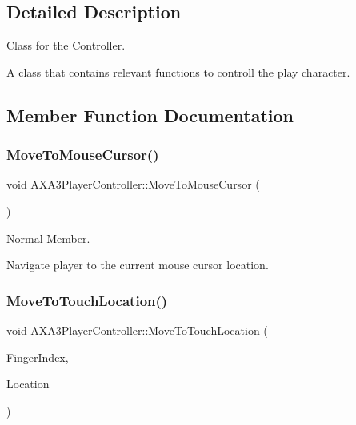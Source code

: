 \subsection{Detailed Description}
Class for the Controller. 

A class that contains relevant functions to controll the play character. 

\subsection{Member Function Documentation}
\hypertarget{class_a_x_a3_player_controller_a14779b01d600fdb7b9f4440e06e8288d}{}\label{class_a_x_a3_player_controller_a14779b01d600fdb7b9f4440e06e8288d} 
\subsubsection{\texorpdfstring{Move\+To\+Mouse\+Cursor()}{MoveToMouseCursor()}}
{\footnotesize\ttfamily void A\+X\+A3\+Player\+Controller\+::\+Move\+To\+Mouse\+Cursor (\begin{DoxyParamCaption}{ }\end{DoxyParamCaption})\hspace{0.3cm}{\ttfamily [protected]}}



Normal Member. 

Navigate player to the current mouse cursor location. \hypertarget{class_a_x_a3_player_controller_a491c620eeaa2db69f8fb4e5a2b1c5cb3}{}\label{class_a_x_a3_player_controller_a491c620eeaa2db69f8fb4e5a2b1c5cb3} 
\subsubsection{\texorpdfstring{Move\+To\+Touch\+Location()}{MoveToTouchLocation()}}
{\footnotesize\ttfamily void A\+X\+A3\+Player\+Controller\+::\+Move\+To\+Touch\+Location (\begin{DoxyParamCaption}\item[{const E\+Touch\+Index\+::\+Type}]{Finger\+Index,  }\item[{const F\+Vector}]{Location }\end{DoxyParamCaption})\hspace{0.3cm}{\ttfamily [protected]}}



